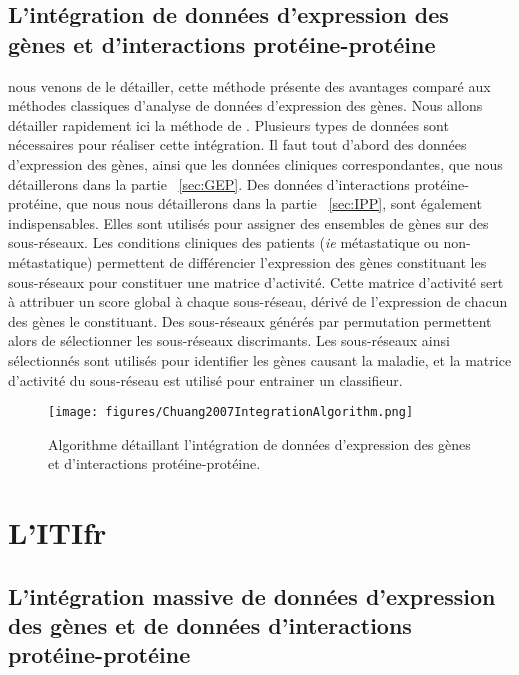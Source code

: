 		\subsection{\textcolor{green!60!black}{L'intégration de données d'expression des gènes et d'interactions protéine-protéine}}
			 nous venons de le détailler, cette méthode présente des avantages comparé aux méthodes classiques d'analyse de données d'expression des gènes.
			Nous allons détailler rapidement ici la méthode de \citeauthor{Chuang2007}.
			Plusieurs types de données sont nécessaires pour réaliser cette intégration.
			Il faut tout d'abord des données d'expression des gènes, ainsi que les données cliniques correspondantes, que nous détaillerons dans la partie ~\ref{sec:GEP}.
			Des données d'interactions protéine-protéine, que nous nous détaillerons dans la partie ~\ref{sec:IPP}, sont également indispensables.
			Elles sont utilisés pour assigner des ensembles de gènes sur des sous-réseaux.
			Les conditions cliniques des patients (\emph{ie} métastatique ou non-métastatique) permettent de différencier l'expression des gènes constituant les sous-réseaux pour constituer une matrice d'activité.
			Cette matrice d'activité sert à attribuer un score global à chaque sous-réseau, dérivé de l'expression de chacun des gènes le constituant.
			Des sous-réseaux générés par permutation permettent alors de sélectionner les sous-réseaux discrimants.
			Les sous-réseaux ainsi sélectionnés sont utilisés pour identifier les gènes causant la maladie, et la matrice d'activité du sous-réseau est utilisé pour entrainer un classifieur.

			\begin{figure}
				\centering
				\texttt{[image: figures/Chuang2007IntegrationAlgorithm.png]}
				\caption{Algorithme détaillant l'intégration de données d'expression des gènes et d'interactions protéine-protéine\citep{Chuang2007}.}
				\label{fig:Chuang2007IntegrationAlgorithm}
			\end{figure}
		
	\section{\textcolor{green!60!black}{L'\acl{ITIfr}}}

		\subsection{\textcolor{green!60!black}{L'intégration massive de données d'expression des gènes et de données d'interactions protéine-protéine}}

